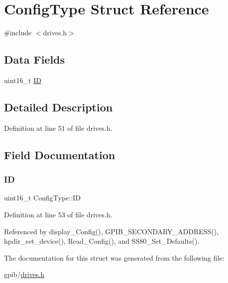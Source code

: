 \hypertarget{structConfigType}{}\section{Config\+Type Struct Reference}
\label{structConfigType}


{\ttfamily \#include $<$drives.\+h$>$}

\subsection*{Data Fields}
\begin{DoxyCompactItemize}
\item 
uint16\+\_\+t \hyperlink{structConfigType_a7d89346361dc0f06db0917c7ff37501a}{ID}
\end{DoxyCompactItemize}


\subsection{Detailed Description}


Definition at line 51 of file drives.\+h.



\subsection{Field Documentation}
\mbox{\label{structConfigType_a7d89346361dc0f06db0917c7ff37501a}} 
\subsubsection{\texorpdfstring{ID}{ID}}
{\footnotesize\ttfamily uint16\+\_\+t Config\+Type\+::\+ID}



Definition at line 53 of file drives.\+h.



Referenced by display\+\_\+\+Config(), G\+P\+I\+B\+\_\+\+S\+E\+C\+O\+N\+D\+A\+R\+Y\+\_\+\+A\+D\+D\+R\+E\+S\+S(), hpdir\+\_\+set\+\_\+device(), Read\+\_\+\+Config(), and S\+S80\+\_\+\+Set\+\_\+\+Defaults().



The documentation for this struct was generated from the following file\+:\begin{DoxyCompactItemize}
\item 
gpib/\hyperlink{drives_8h}{drives.\+h}\end{DoxyCompactItemize}
